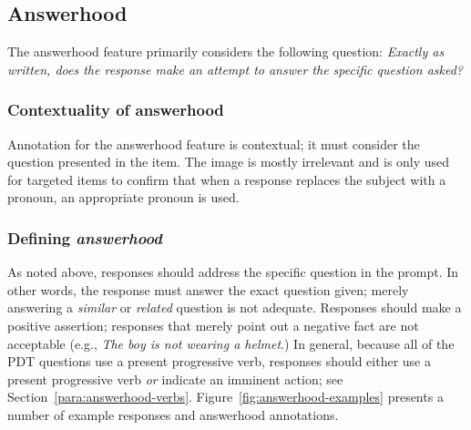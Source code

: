 \documentclass[12pt,notitlepage]{article}
\begin{document}
\subsection{Answerhood} \label{subsec:answerhood}

The answerhood feature primarily considers the following question: \textit{Exactly as written, does the response make an attempt to answer the specific question asked?}

\subsubsection{Contextuality of answerhood} Annotation for the answerhood feature is contextual; it must consider the question presented in the item. The image is mostly irrelevant and is only used for targeted items to confirm that when a response replaces the subject with a pronoun, an appropriate pronoun is used.

\subsubsection{Defining \textit{answerhood}} As noted above, responses should address the specific question in the prompt. In other words, the response must answer the exact question given; merely answering a \textit{similar} or \textit{related} question is not adequate. Responses should make a positive assertion; responses that merely point out a negative fact are not acceptable (e.g., \textit{The boy is not wearing a helmet}.) In general, because all of the PDT questions use a present progressive verb, responses should either use a present progressive verb \textit{or} indicate an imminent action; see Section~\ref{para:answerhood-verbs}. Figure~\ref{fig:answerhood-examples} presents a number of example responses and answerhood annotations. 
\end{document}
